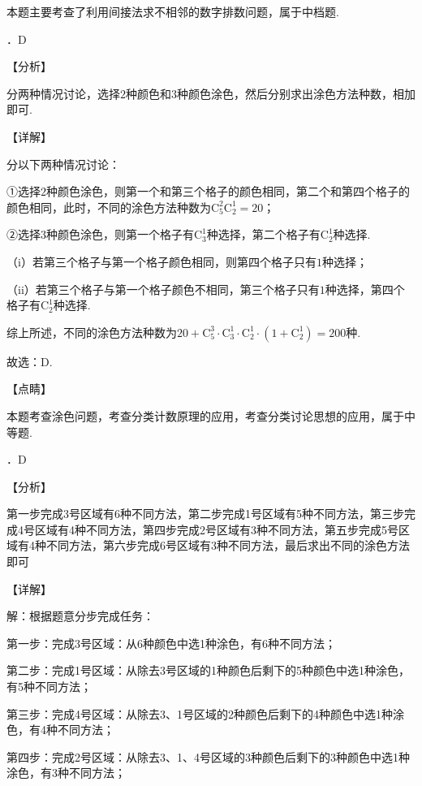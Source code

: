 \noindent 本题主要考查了利用间接法求不相邻的数字排数问题，属于中档题.

．D

\noindent 【分析】

\noindent 分两种情况讨论，选择$2$种颜色和$3$种颜色涂色，然后分别求出涂色方法种数，相加即可.

\noindent 【详解】

\noindent 分以下两种情况讨论：

\noindent ①选择$2$种颜色涂色，则第一个和第三个格子的颜色相同，第二个和第四个格子的颜色相同，此时，不同的涂色方法种数为$\mathrm C_{5}^{2} \mathrm C_{2}^{1} =20$；

\noindent ②选择$3$种颜色涂色，则第一个格子有$\mathrm C_{3}^{1} $种选择，第二个格子有$\mathrm C_{2}^{1} $种选择.

\noindent （i）若第三个格子与第一个格子颜色相同，则第四个格子只有$1$种选择；

\noindent （ii）若第三个格子与第一个格子颜色不相同，第三个格子只有$1$种选择，第四个格子有$\mathrm C_{2}^{1} $种选择.

\noindent 综上所述，不同的涂色方法种数为$20+\mathrm C_{5}^{3} \cdot \mathrm C_{3}^{1} \cdot \mathrm C_{2}^{1} \cdot \left(1+\mathrm C_{2}^{1} \right)=200$种.

\noindent 故选：D.

\noindent 【点睛】

\noindent 本题考查涂色问题，考查分类计数原理的应用，考查分类讨论思想的应用，属于中等题.

．D

\noindent 【分析】

\noindent 第一步完成3号区域有6种不同方法，第二步完成1号区域有5种不同方法，第三步完成4号区域有4种不同方法，第四步完成2号区域有3种不同方法，第五步完成5号区域有4种不同方法，第六步完成6号区域有3种不同方法，最后求出不同的涂色方法即可

\noindent 【详解】

\noindent 解：根据题意分步完成任务：

\noindent 第一步：完成3号区域：从6种颜色中选1种涂色，有6种不同方法；

\noindent 第二步：完成1号区域：从除去3号区域的1种颜色后剩下的5种颜色中选1种涂色，有5种不同方法；

\noindent 第三步：完成4号区域：从除去3、1号区域的2种颜色后剩下的4种颜色中选1种涂色，有4种不同方法；

\noindent 第四步：完成2号区域：从除去3、1、4号区域的3种颜色后剩下的3种颜色中选1种涂色，有3种不同方法；


